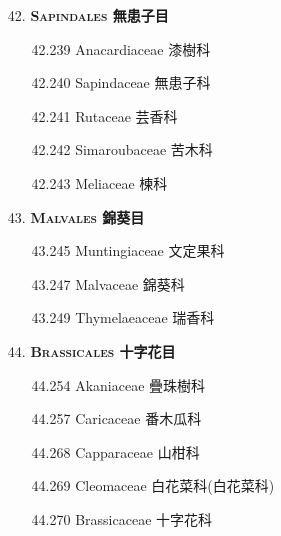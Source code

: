 \begin{enumerate}
  \item[42. ] \textbf{\textsc{Sapindales} 無患子目}   
    \begin{enumerate}
      \item[42.239] Anacardiaceae 漆樹科     
        
      \item[42.240] Sapindaceae 無患子科     
        
      \item[42.241] Rutaceae 芸香科     
        
      \item[42.242] Simaroubaceae 苦木科     
        
      \item[42.243] Meliaceae 楝科     
        
    \end{enumerate}
  \item[43. ] \textbf{\textsc{Malvales} 錦葵目}   
    \begin{enumerate}
      \item[43.245] Muntingiaceae 文定果科     
        
      \item[43.247] Malvaceae 錦葵科     
        
      \item[43.249] Thymelaeaceae 瑞香科     
        
    \end{enumerate}
  \item[44. ] \textbf{\textsc{Brassicales} 十字花目}   
    \begin{enumerate}
      \item[44.254] Akaniaceae 疊珠樹科     
        
      \item[44.257] Caricaceae 番木瓜科     
        
      \item[44.268] Capparaceae 山柑科     
        
      \item[44.269] Cleomaceae 白花菜科(白花菜科)     
        
      \item[44.270] Brassicaceae 十字花科     
        
    \end{enumerate}
\end{enumerate}
